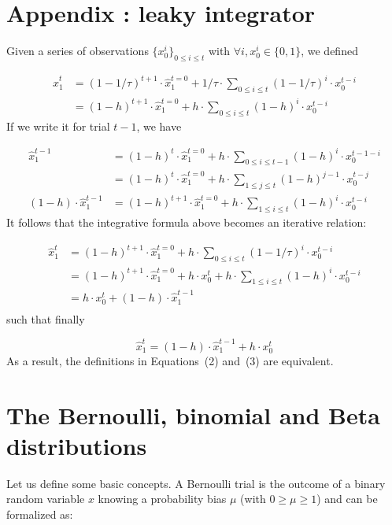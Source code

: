 \documentclass[10pt,letterpaper]{article}
\newcommand{\eq}[1]{\begin{equation*}#1\end{equation*}}
\newcommand{\eqs}[1]{\begin{align*}#1\end{align*}}
\newcommand{\seeEq}[1]{Equation~\ref{eq:#1}}
\begin{document}
\section{Appendix : leaky integrator}
\label{app:leaky}
Given a series of observations $\{x_0^i\}_{0\leq i \leq t}$
with $\forall i, x_0^i \in \{0, 1 \}$, we defined

\eqs{
\hat{x}_1^{t} &= (1-1/\tau)^{t+1} \cdot \hat{x}_1^{t=0} + 1/\tau \cdot \sum_{0\leq i \leq t} (1 - 1/\tau)^{i} \cdot x_0^{t-i}\\
			  &= (1-h)^{t+1} \cdot \hat{x}_1^{t=0} + h \cdot \sum_{0\leq i \leq t} (1 - h)^{i} \cdot x_0^{t-i}
}
If we write it for trial $t-1$, we have

\eqs{
\hat{x}_1^{t-1}	&= (1-h)^{t} \cdot \hat{x}_1^{t=0} + h \cdot \sum_{0\leq i \leq t-1} (1 - h)^{i} \cdot x_0^{t-1-i} \\
                &= (1-h)^{t} \cdot \hat{x}_1^{t=0} + h \cdot \sum_{1\leq j \leq t} (1 - h)^{j-1} \cdot x_0^{t-j} \\ %
(1 - h) \cdot \hat{x}_1^{t-1} &= (1-h)^{t+1} \cdot \hat{x}_1^{t=0} +  h \cdot \sum_{1\leq i \leq t} (1 - h)^{i} \cdot x_0^{t-i}
                }
It follows that the integrative formula above becomes an iterative relation:

\eqs{
\hat{x}_1^{t}	&= (1-h)^{t+1} \cdot \hat{x}_1^{t=0} + h \cdot \sum_{0\leq i \leq t} (1 - 1/\tau)^{i} \cdot x_0^{t-i} \\
				&= (1-h)^{t+1} \cdot \hat{x}_1^{t=0} + h \cdot x_0^{t} + h \cdot \sum_{1\leq i \leq t} (1 - h)^{i} \cdot x_0^{t-i} \\
				&= h \cdot x_0^{t} + (1 - h) \cdot \hat{x}_1^{t-1} \\
}
such that finally

\eq{
\hat{x}_1^{t} = (1 - h) \cdot \hat{x}_1^{t-1} + h \cdot x_0^t
}
As a result, the definitions in Equations~(2) %
and~(3)%
are equivalent.


\section{The Bernoulli, binomial and Beta distributions}
\label{app:beta}

Let us define some basic concepts. A Bernoulli trial is the outcome of a binary random variable $x$ knowing a probability bias $\mu$ (with $0 \geq \mu \geq 1$) and can be formalized as:
\end{document}
